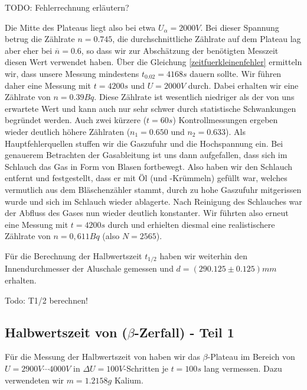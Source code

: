 TODO: Fehlerrechnung erläutern?

Die Mitte des Plateaus liegt also bei etwa $U_{\alpha} = 2000 V$. Bei dieser Spannung betrug die Zählrate $n = 0.745$, die durchschnittliche Zählrate auf dem Plateau lag aber eher bei $\overline{n} = 0.6$, so dass wir zur Abschätzung der benötigten Messzeit diesen Wert verwendet haben. Über die Gleichung \ref{zeitfuerkleinenfehler} ermitteln wir, dass unsere Messung mindestens $t_{0.02} = 4168 s$ dauern sollte. Wir führen daher eine Messung mit $t = 4200s$ und $ U = 2000 V$ durch. Dabei erhalten wir eine Zählrate von $n = 0.39 Bq$. Diese Zählrate ist wesentlich niedriger als der von uns erwartete Wert und kann auch nur sehr schwer durch statistische Schwankungen begründet werden. Auch zwei kürzere ($t = 60s$) Kontrollmessungen ergeben wieder deutlich höhere Zählraten ($n_1 = 0.650$ und $n_2 = 0.633$). Als Hauptfehlerquellen stuffen wir die Gaszufuhr und die Hochspannung ein. Bei genauerem Betrachten der Gasableitung ist uns dann aufgefallen, dass sich im Schlauch das Gas in Form von Blasen fortbewegt. Also haben wir den Schlauch entfernt und festgestellt, dass er mit Öl (und -Krümmeln) gefüllt war, welches vermutlich aus dem Bläschenzähler stammt, durch zu hohe Gaszufuhr mitgerissen wurde und sich im Schlauch wieder ablagerte. Nach Reinigung des Schlauches war der Abfluss des Gases nun wieder deutlich konstanter. Wir führten also erneut eine Messung mit $t=4200s$ durch und erhielten diesmal eine realistischere Zählrate von $n = 0,611 Bq$ (also $N = 2565$). 

Für die Berechnung der Halbwertszeit $t_{1/2}$ haben wir weiterhin den Innendurchmesser der Aluschale gemessen und $d = (290.125 \pm 0.125) mm$ erhalten.

Todo: T1/2 berechnen!

\subsection{Halbwertszeit von  ($\beta$-Zerfall) - Teil 1}

Für die Messung der Halbwertszeit von  haben wir das $\beta$-Plateau im Bereich von $U = 2900V \cdots 4000V$ in $\Delta U = 100 V$-Schritten je $t=100s$ lang vermessen. Dazu verwendeten wir $m=1.2158g$ Kalium.

